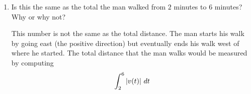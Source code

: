 \documentclass[handout,nooutcomes]{ximera}
\begin{document}
\begin{problem}
\begin{enumerate}
		
		
	\item  Is this the same as the total  the man walked from $2$ minutes to $6$ minutes?  Why or why not?
		\begin{freeResponse}
		This number is not the same as the total distance.  The man starts his walk by going east (the positive direction) but eventually ends his walk west of where he started.  
		The total distance that the man walks would be measured by computing 
		$$\int_2^6 \left| v(t) \right| \,d t$$  
		\end{freeResponse}
		
		
		
	\end{enumerate}
		
		
		

		
		
		

\end{problem}
	
	
	
	
	
	
	
	
			
			
\end{document}
